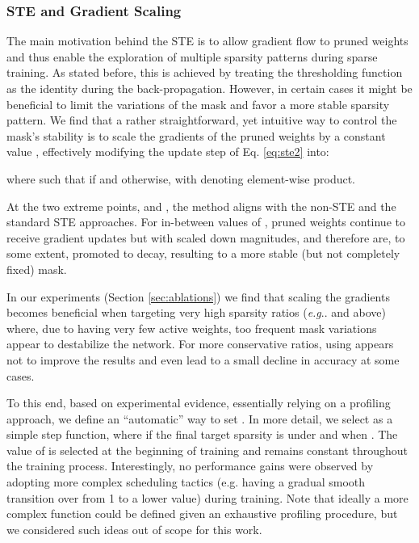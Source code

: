 \documentclass{article}
\makeatletter
\DeclareRobustCommand\onedot{\futurelet\@let@token\@onedot}
\def\@onedot{\ifx\@let@token.\else.\null\fi\xspace}
\def\eg{\emph{e.g}\onedot}
\makeatother
\begin{document}
\subsubsection{STE and Gradient Scaling}
\label{sec:scaling}

The main motivation behind the STE is to allow gradient flow to pruned weights and thus enable the exploration of multiple sparsity patterns during sparse training. As stated before, this is achieved by treating the thresholding function as the identity during the back-propagation. However, in certain cases it might be beneficial to limit the variations of the mask and favor a more stable sparsity pattern. We find that a rather straightforward, yet intuitive way to control the mask's stability is to scale the gradients of the pruned weights by a constant value , effectively modifying the update step of Eq. \ref{eq:ste2} into:

where  such that  if  and   otherwise, with  denoting element-wise product.

At the two extreme points,  and , the method aligns with the non-STE and the standard STE approaches. For in-between values of , pruned weights continue to receive gradient updates but with scaled down magnitudes, and therefore are, to some extent, promoted to decay, resulting to a more stable (but not completely fixed) mask.

In our experiments (Section \ref{sec:ablations}) we find that scaling the gradients becomes beneficial when targeting very high sparsity ratios  (\eg  and above) where, due to having very few active weights, too frequent mask variations appear to destabilize the network. For more conservative ratios, using  appears not to improve the results and even lead to a small decline in accuracy at some cases. 

To this end, based on experimental evidence, essentially relying on a profiling approach, we define an ``automatic'' way to set . 
In more detail, we select  as a simple step function, where  if the final target sparsity  is under  and  when . The value of  is selected at the beginning of training and remains constant throughout the training process.
Interestingly, no performance gains were observed by adopting more complex scheduling tactics (e.g. having a gradual smooth transition over  from 1 to a lower value) during training. Note that ideally a more complex function could be defined given an exhaustive profiling procedure, but we considered such ideas out of scope for this work.
\end{document}

